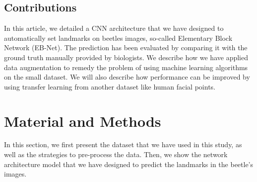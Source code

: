 \documentclass[review]{elsarticle}
\begin{document}
\subsection{Contributions}
In this article, we detailed a CNN architecture that we have designed to automatically set landmarks on beetles images, so-called Elementary Block Network (EB-Net). The prediction has been evaluated by comparing it with the ground truth manually provided by biologists. We describe how we have applied data augmentation to remedy the problem of using machine learning algorithms on the small dataset. We will also describe how performance can be improved by using transfer learning from another dataset like human facial points.

\section{Material and Methods}
\label{sec2}
In this section, we first present the dataset that we have used in this study, as well as the strategies to pre-process the data. Then, we show the network architecture model that we have designed to predict the landmarks in the beetle's images.
\end{document}
